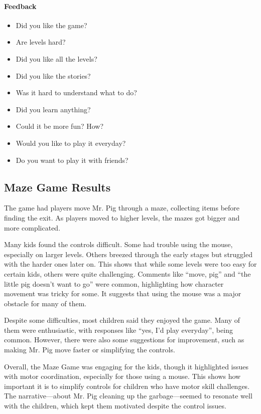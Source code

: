 \paragraph{Feedback}
\begin{itemize}
    \item Did you like the game?
    \item Are levels hard?
    \item Did you like all the levels?
    \item Did you like the stories?
    \item Was it hard to understand what to do?
    \item Did you learn anything?
    \item Could it be more fun? How?
    \item Would you like to play it everyday?
    \item Do you want to play it with friends?
\end{itemize}


\subsection{Maze Game Results}
The game had players move Mr. Pig through a maze, collecting items before finding the exit. As players moved to higher levels, the mazes got bigger and more complicated.

Many kids found the controls difficult. Some had trouble using the mouse, especially on larger levels. Others breezed through the early stages but struggled with the harder ones later on. This shows that while some levels were too easy for certain kids, others were quite challenging. Comments like “move, pig” and “the little pig doesn’t want to go” were common, highlighting how character movement was tricky for some. It suggests that using the mouse was a major obstacle for many of them.

Despite some difficulties, most children said they enjoyed the game. Many of them were enthusiastic, with responses like “yes, I'd play everyday”, being common. However, there were also some suggestions for improvement, such as making Mr. Pig move faster or simplifying the controls.

Overall, the Maze Game was engaging for the kids, though it highlighted issues with motor coordination, especially for those using a mouse. This shows how important it is to simplify controls for children who have motor skill challenges. The narrative—about Mr. Pig cleaning up the garbage—seemed to resonate well with the children, which kept them motivated despite the control issues.

